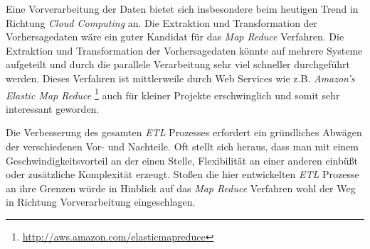 Eine Vorverarbeitung der Daten bietet sich insbesondere beim heutigen
Trend in Richtung \textit{Cloud Computing} an. Die Extraktion und
Transformation der Vorhersagedaten wäre ein guter Kandidat für das
\textit{Map Reduce} Verfahren. Die Extraktion und Transformation der
Vorhersagedaten könnte auf mehrere Systeme aufgeteilt und durch die
parallele Verarbeitung sehr viel schneller durchgeführt werden.
Dieses Verfahren ist mittlerweile durch Web Services wie
z.B. \textit{Amazon's Elastic Map Reduce}
\footnote{\url{http://aws.amazon.com/elasticmapreduce}} auch für
kleiner Projekte erschwinglich und somit sehr interessant geworden.

Die Verbesserung des gesamten \textit{ETL} Prozesses erfordert ein
gründliches Abwägen der verschiedenen Vor- und Nachteile. Oft stellt
sich heraus, dass man mit einem Geschwindigkeitsvorteil an der einen
Stelle, Flexibilität an einer anderen einbüßt oder zusätzliche
Komplexität erzeugt. Stoßen die hier entwickelten \textit{ETL}
Prozesse an ihre Grenzen würde in Hinblick auf das \textit{Map Reduce}
Verfahren wohl der Weg in Richtung Vorverarbeitung eingeschlagen.

